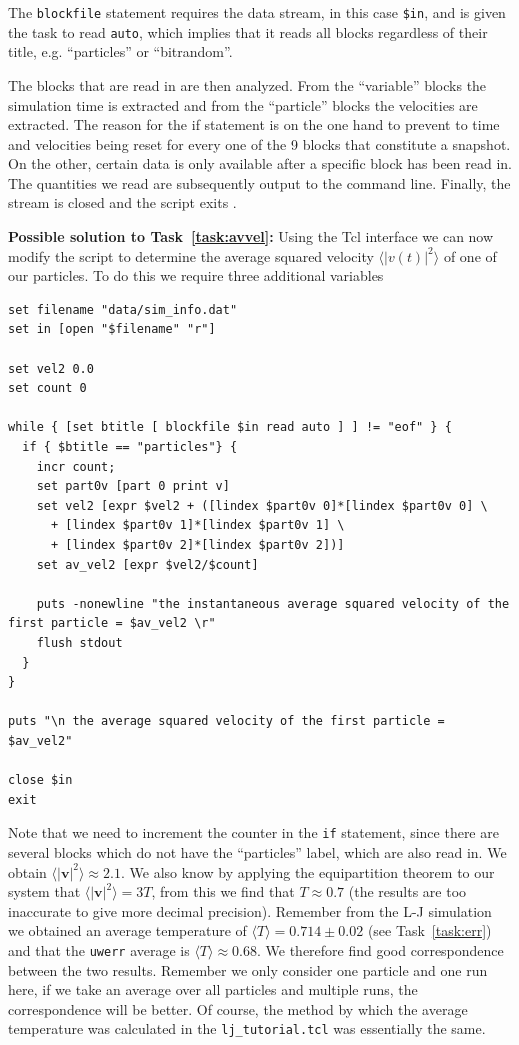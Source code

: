 \documentclass[
paper=a4,                       %
fontsize=11pt,                  %
twoside,                        %
footsepline,                    %
headsepline,                    %
headinclude=false,              %
footinclude=false,              %
pagesize,                       %
]{scrartcl}
\begin{document}
\noindent The \lstinline|blockfile| statement requires the data stream, in this case \texttt{\$in}, and is given the task to read \texttt{auto}, which implies that it reads all blocks regardless of their title, e.g. ``particles'' or ``bitrandom''.

The blocks that are read in are then analyzed. From the ``variable'' blocks the simulation time is extracted and from the ``particle'' blocks the velocities are extracted. The reason for the if statement is on the one hand to prevent to time and velocities being reset for every one of the 9 blocks that constitute a snapshot. On the other, certain data is only available after a specific block has been read in. The quantities we read are subsequently output to the command line. Finally, the stream is closed and the script exits \es{}.

\textbf{Possible solution to Task~\ref{task:avvel}:} Using the Tcl interface we can now modify the script to determine the average squared velocity $\langle \vert v(t) \vert^{2} \rangle$ of one of our particles. To do this we require three additional variables

{\small\vspace{0,2cm}
\begin{lstlisting}[numbers=none]
set filename "data/sim_info.dat"
set in [open "$filename" "r"]

set vel2 0.0
set count 0

while { [set btitle [ blockfile $in read auto ] ] != "eof" } {
  if { $btitle == "particles"} {
    incr count;
    set part0v [part 0 print v]
    set vel2 [expr $vel2 + ([lindex $part0v 0]*[lindex $part0v 0] \
      + [lindex $part0v 1]*[lindex $part0v 1] \
      + [lindex $part0v 2]*[lindex $part0v 2])]
    set av_vel2 [expr $vel2/$count]

    puts -nonewline "the instantaneous average squared velocity of the first particle = $av_vel2 \r"
    flush stdout
  }
}

puts "\n the average squared velocity of the first particle = $av_vel2"

close $in
exit
\end{lstlisting}\vspace{0,2cm}
}

\noindent Note that we need to increment the counter in the \lstinline|if| statement, since there are several blocks which do not have the ``particles'' label, which are also read in. We obtain $\langle \vert \mathbf{v} \vert^{2} \rangle \approx 2.1$. We also know by applying the equipartition theorem to our system that $\langle \vert \mathbf{v} \vert^{2} \rangle = 3 T$, from this we find that $T \approx 0.7$ (the results are too inaccurate to give more decimal precision). Remember from the L-J simulation we obtained an average temperature of $\langle T \rangle = 0.714 \pm 0.02$ (see Task~\ref{task:err}) and that the \lstinline|uwerr| average is $\langle T \rangle \approx 0.68$. We therefore find good correspondence between the two results. Remember we only consider one particle and one run here, if we take an average over all particles and multiple runs, the correspondence will be better. Of course, the method by which the average temperature was calculated in the \texttt{lj\_tutorial.tcl} was essentially the same.
\end{document}
